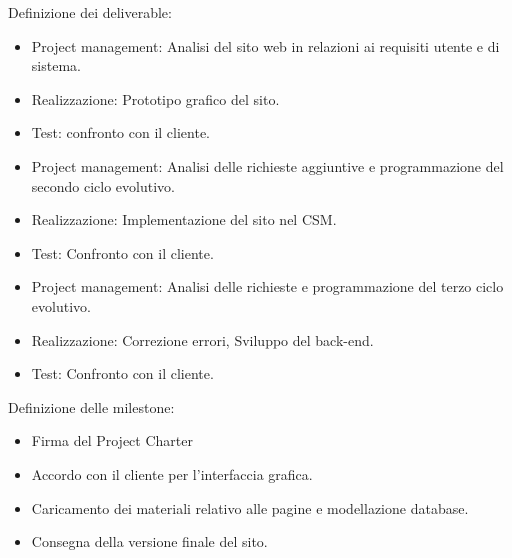 \documentclass{article}
\begin{document}
	\begin{flushleft}

		Definizione dei deliverable:

		\begin{itemize}

			\item Project management: Analisi del sito web in relazioni ai requisiti utente e di sistema.

			\item Realizzazione: Prototipo grafico del sito.

			\item Test: confronto con il cliente.
			
			\item Project management: Analisi delle richieste aggiuntive e programmazione del secondo ciclo evolutivo.

			\item Realizzazione: Implementazione del sito nel CSM.
			
			\item Test: Confronto con il cliente.
		
			\item Project management: Analisi delle richieste e programmazione del terzo ciclo evolutivo.

			\item Realizzazione: Correzione errori, Sviluppo del back-end.
			
			\item Test: Confronto con il cliente.				

		\end{itemize}

		

		Definizione delle milestone:

		\begin{itemize}
            
            \item Firma del Project Charter
            
			\item Accordo con il cliente per l'interfaccia grafica.

			\item Caricamento dei materiali relativo alle pagine e modellazione database.

			\item Consegna della versione finale del sito.

		\end{itemize}
        

\end{flushleft}
\end{document}

